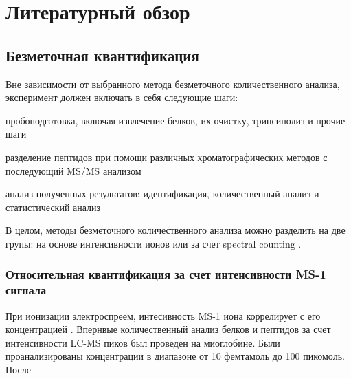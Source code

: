 \section{Литературный обзор}

\subsection{Безметочная квантификация}
Вне зависимости от выбранного метода безметочного количественного анализа, эксперимент должен включать в себя следующие шаги:
\begin{inparaenum}
    \item  пробоподготовка, включая извлечение белков, их очистку, трипсинолиз и прочие шаги 
    \item разделение пептидов при помощи различных хроматографических методов с 
    последующий MS/MS анализом 
    \item анализ полученных результатов: идентификация, количественный анализ и статистический анализ
\end{inparaenum}
В целом, методы безметочного количественного анализа можно разделить на две групы: на основе интенсивности ионов или за счет spectral counting \cite{zhu2009mass}.

\subsubsection{Относительная квантификация за счет интенсивности MS-1 сигнала}
При ионизации электроспреем, интесивность MS-1 иона коррелирует с его концентрацией \cite{voyksner1999investigating}. 
Впернвые количественный анализ белков и пептидов за счет интенсивности LC-MS пиков был проведен на миоглобине. Были проанализированы концентрации в диапазоне от 10 фемтамоль до 100 пикомоль.
После 


\newpage
